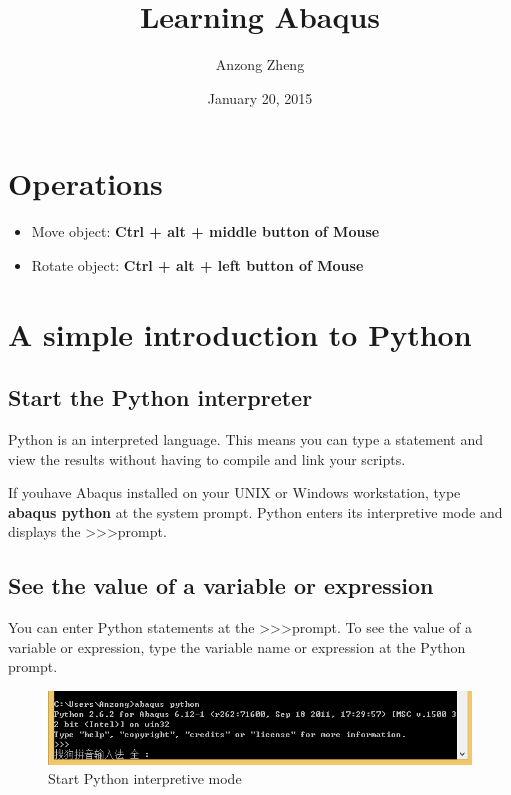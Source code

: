 \documentclass[10pt,a4paper]{article}
\begin{document}
\author{Anzong Zheng}
\title{Learning Abaqus}
\date{January 20, 2015}
\maketitle

\tableofcontents

\newpage

\section{Operations}
\begin{itemize}
	\item Move object: \textbf{Ctrl + alt + middle button of Mouse}
	\item Rotate object: \textbf{Ctrl + alt + left button of Mouse}
\end{itemize}

\section{A simple introduction to Python}
\subsection{Start the Python interpreter}
Python is an interpreted language. This means you can type a statement and view the results without having to compile and link your scripts.

If youhave Abaqus installed on your UNIX or Windows workstation, type \textbf{abaqus python} at the system prompt. Python enters its interpretive mode and displays the \textgreater \textgreater \textgreater prompt.

\subsection{See the value of a variable or expression}
You can enter Python statements at the \textgreater \textgreater \textgreater prompt. To see the value of a variable or expression, type the variable name or expression at the Python prompt. 

\begin{figure}[h]
\centering
\includegraphics[width=0.7\linewidth]{"Start Python interpretive mode"}
\caption{Start Python interpretive mode} \label{fig:StartPythoninterpretivemode}
\vspace{\baselineskip}
\end{figure}
\end{document}
